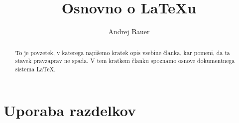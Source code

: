 \documentclass[a4paper]{article}
\begin{document}

\title{Osnovno o {\LaTeX}u}
\author{Andrej Bauer}


\maketitle


\begin{abstract}
  To je povzetek, v katerega napišemo kratek opis vsebine članka, kar pomeni, da ta stavek
  pravzaprav ne spada. V tem kratkem članku spoznamo osnove dokumentnega sistema {\LaTeX}.
\end{abstract}


\section{Uporaba razdelkov}

\end{document}
